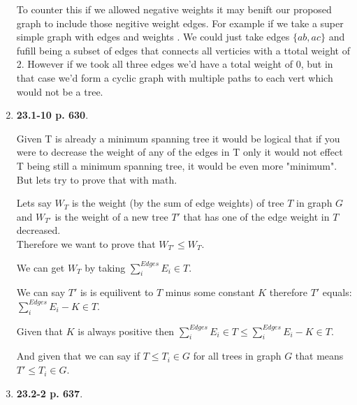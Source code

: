 \documentclass{article}
\begin{document}
\begin{enumerate}
    To counter this if we allowed negative weights it may benift our proposed graph to include those negitive weight edges. For example if we take a super simple graph with edges  and weights .
    We could just take edges $\{ab, ac\}$ and fufill being a subset of edges that connects all verticies with a ttotal weight of 2. However if we took all three edges we'd have a total weight of 0, but in that case we'd form a cyclic graph with multiple paths to each vert which would not be a tree.

    \item \textbf{23.1-10 p. 630}.
    
    Given T is already a minimum spanning tree it would be logical that if you were to decrease the weight of any of the edges in T only it would not effect T being still a minimum spanning tree, it would be even more "minimum". 
    But lets try to prove that with math. 

    Lets say $W_T$ is the weight (by the sum of edge weights) of tree $T$ in graph $G$ and $W_{T'}$ is the weight of a new tree $T'$ that has one of the edge weight in $T$ decreased.\\

    Therefore we want to prove that $W_{T'} \leq W_T$. 

    We can get $W_T$ by taking $\sum_{i}^{Edges} E_i \in T$.

    We can say $T'$ is is equilivent to $T$ minus some constant $K$ therefore $T'$ equals: $\sum_{i}^{Edges} E_i - K \in T$.

    Given that $K$ is always positive then $\sum_{i}^{Edges} E_i \in T \leq \sum_{i}^{Edges} E_i - K \in T$.

    And given that we can say if $T \leq T_i \in G$ for all trees in graph $G$ that means $T' \leq T_i \in G$.

    \item \textbf{23.2-2 p. 637}. 
    


  \end{enumerate} %
\end{document}
